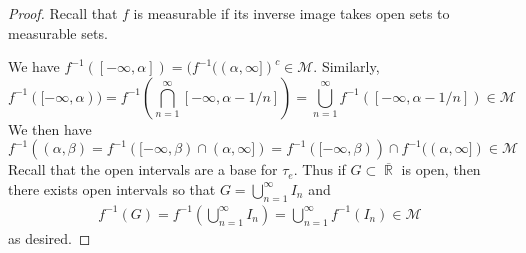 \documentclass[12pt, a4paper]{book}
\DeclareMathOperator{\R}{\mathbb{R}}
\theoremstyle{nonumberplain}
\newtheorem{proof}{Proof}
\begin{document}
\begin{proof}
    Recall that $f$ is measurable if its inverse image takes open sets to measurable sets.

    We have $f^{-1}([-\infty,\alpha])=(f^{-1}( (\alpha,\infty])^c\in\mathcal{M}$. %
    Similarly,
    \begin{equation*}
        f^{-1}([-\infty,\alpha))=f^{-1}\left(\bigcap_{n=1}^\infty[-\infty,\alpha-1/n]\right)=\bigcup_{n=1}^\infty f^{-1}([-\infty,\alpha-1/n])\in\mathcal{M}
    \end{equation*} %
    We then have
    \[f^{-1}((\alpha,\beta)=f^{-1}([-\infty,\beta)\cap(\alpha,\infty])=f^{-1}([-\infty,\beta))\cap f^{-1}((\alpha,\infty])\in\mathcal{M}\]%
    Recall that the open intervals are a base for $\tau_e$.
    Thus if $G\subset\overline{\R}$ is open, then there exists open intervals so that $G=\bigcup_{n=1}^\infty I_n$ and
    \begin{align*}
        f^{-1}(G)=f^{-1}\left(\bigcup_{n=1}^\infty I_n\right)=\bigcup_{n=1}^\infty f^{-1}(I_n)\in\mathcal{M}
    \end{align*}
    as desired.
\end{proof}
\end{document}
